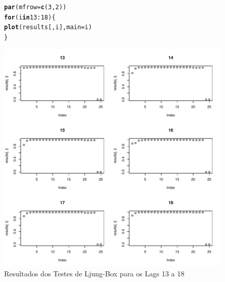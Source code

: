 \documentclass{article}\usepackage[]{graphicx}\usepackage[]{color}
\makeatletter
\def\maxwidth{ %
  \ifdim\Gin@nat@width>\linewidth
    \linewidth
  \else
    \Gin@nat@width
  \fi
}
\newcommand{\hlnum}[1]{\textcolor[rgb]{0.686,0.059,0.569}{#1}}%
\newcommand{\hlopt}[1]{\textcolor[rgb]{0,0,0}{#1}}%
\newcommand{\hlstd}[1]{\textcolor[rgb]{0.345,0.345,0.345}{#1}}%
\newcommand{\hlkwa}[1]{\textcolor[rgb]{0.161,0.373,0.58}{\textbf{#1}}}%
\newcommand{\hlkwc}[1]{\textcolor[rgb]{0.333,0.667,0.333}{#1}}%
\newcommand{\hlkwd}[1]{\textcolor[rgb]{0.737,0.353,0.396}{\textbf{#1}}}%
\newenvironment{kframe}{%
 \def\at@end@of@kframe{}%
 \ifinner\ifhmode%
  \def\at@end@of@kframe{\end{minipage}}%
  \begin{minipage}{\columnwidth}%
 \fi\fi%
 \def\FrameCommand##1{\hskip\@totalleftmargin \hskip-\fboxsep
 \colorbox{shadecolor}{##1}\hskip-\fboxsep
     \hskip-\linewidth \hskip-\@totalleftmargin \hskip\columnwidth}%
 \MakeFramed {\advance\hsize-\width
   \@totalleftmargin\z@ \linewidth\hsize
   \@setminipage}}%
 {\par\unskip\endMakeFramed%
 \at@end@of@kframe}
\newenvironment{knitrout}{}{} %
\makeatother
\begin{document}
            \begin{figure}[H]
            \caption{Resultados dos Testes de Ljung-Box para os Lags 13 a 18}
            \centering
\begin{knitrout}
\color{fgcolor}\begin{kframe}
\begin{alltt}
\hlkwd{par}\hlstd{(}\hlkwc{mfrow} \hlstd{=} \hlkwd{c}\hlstd{(}\hlnum{3}\hlstd{,}\hlnum{2}\hlstd{))}
\hlkwa{for} \hlstd{(i} \hlkwa{in} \hlnum{13}\hlopt{:}\hlnum{18}\hlstd{)\{}
  \hlkwd{plot}\hlstd{(results[,i],} \hlkwc{main}\hlstd{=i)}
\hlstd{\}}
\end{alltt}
\end{kframe}
\includegraphics[width=\maxwidth]{figure/unnamed-chunk-34-1} 

\end{knitrout}
            \end{figure}
\end{document}
